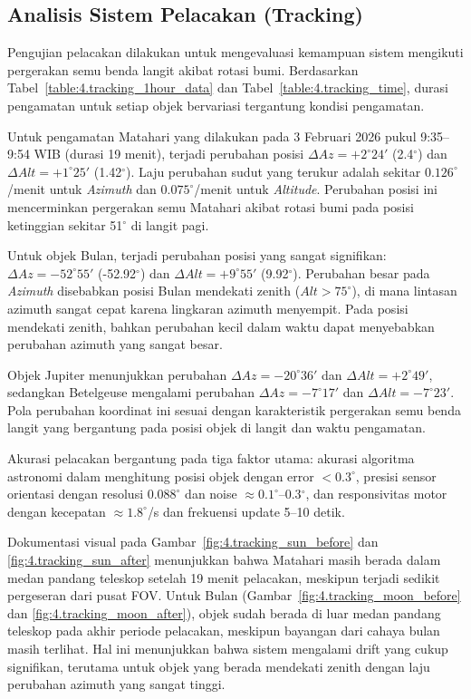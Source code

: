 \subsection{Analisis Sistem Pelacakan (Tracking)} \label{IV.AnalisisTracking}
Pengujian pelacakan dilakukan untuk mengevaluasi kemampuan sistem mengikuti pergerakan semu benda langit akibat rotasi bumi. Berdasarkan Tabel~\ref{table:4.tracking_1hour_data} dan Tabel~\ref{table:4.tracking_time}, durasi pengamatan untuk setiap objek bervariasi tergantung kondisi pengamatan. \par

Untuk pengamatan Matahari yang dilakukan pada 3 Februari 2026 pukul 9:35--9:54 WIB (durasi 19 menit), terjadi perubahan posisi $\Delta Az = +2^\circ24'$ (2.4$^\circ$) dan $\Delta Alt = +1^\circ25'$ (1.42$^\circ$). Laju perubahan sudut yang terukur adalah sekitar $0.126^\circ$/menit untuk \textit{Azimuth} dan $0.075^\circ$/menit untuk \textit{Altitude}. Perubahan posisi ini mencerminkan pergerakan semu Matahari akibat rotasi bumi pada posisi ketinggian sekitar 51$^\circ$ di langit pagi. \par

Untuk objek Bulan, terjadi perubahan posisi yang sangat signifikan: $\Delta Az = -52^\circ55'$ (-52.92$^\circ$) dan $\Delta Alt = +9^\circ55'$ (9.92$^\circ$). Perubahan besar pada \textit{Azimuth} disebabkan posisi Bulan mendekati zenith ($Alt > 75^\circ$), di mana lintasan azimuth sangat cepat karena lingkaran azimuth menyempit. Pada posisi mendekati zenith, bahkan perubahan kecil dalam waktu dapat menyebabkan perubahan azimuth yang sangat besar. \par

Objek Jupiter menunjukkan perubahan $\Delta Az = -20^\circ36'$ dan $\Delta Alt = +2^\circ49'$, sedangkan Betelgeuse mengalami perubahan $\Delta Az = -7^\circ17'$ dan $\Delta Alt = -7^\circ23'$. Pola perubahan koordinat ini sesuai dengan karakteristik pergerakan semu benda langit yang bergantung pada posisi objek di langit dan waktu pengamatan. \par

Akurasi pelacakan bergantung pada tiga faktor utama: akurasi algoritma astronomi dalam menghitung posisi objek dengan error $< 0.3^\circ$, presisi sensor orientasi dengan resolusi $0.088^\circ$ dan noise $\approx 0.1^\circ$--0.3$^\circ$, dan responsivitas motor dengan kecepatan $\approx 1.8^\circ$/s dan frekuensi update 5--10 detik. \par

Dokumentasi visual pada Gambar~\ref{fig:4.tracking_sun_before} dan \ref{fig:4.tracking_sun_after} menunjukkan bahwa Matahari masih berada dalam medan pandang teleskop setelah 19 menit pelacakan, meskipun terjadi sedikit pergeseran dari pusat FOV. Untuk Bulan (Gambar~\ref{fig:4.tracking_moon_before} dan \ref{fig:4.tracking_moon_after}), objek sudah berada di luar medan pandang teleskop pada akhir periode pelacakan, meskipun bayangan dari cahaya bulan masih terlihat. Hal ini menunjukkan bahwa sistem mengalami drift yang cukup signifikan, terutama untuk objek yang berada mendekati zenith dengan laju perubahan azimuth yang sangat tinggi. \par

